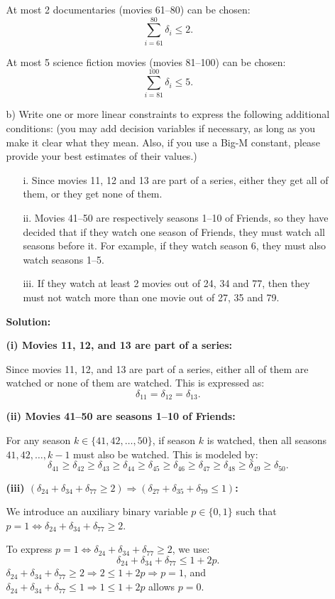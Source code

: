 \documentclass{article}
\begin{document}
\begin{enumerate}
\begin{itemize}
At most 2 documentaries (movies 61--80) can be chosen:
\[
\sum_{i=61}^{80} \delta_i \leq 2.
\]

At most 5 science fiction movies (movies 81--100) can be chosen:
\[
\sum_{i=81}^{100} \delta_i \leq 5.
\]

\item[b)] Write one or more linear constraints to express the following additional conditions: (you may add decision variables if necessary, as long as you make it clear what they mean. Also, if you use a Big-M constant,  please provide your best estimates of their values.)
\begin{itemize}
\item[i.] Since movies 11, 12 and 13 are part of a series, either they get all of them, or they get none of them.
\item[ii.] Movies 41--50 are respectively seasons 1--10 of Friends, so they have decided that if they watch one season of Friends, they must watch all seasons before it. For example, if they watch season 6, they must also watch seasons 1--5.
\item[iii.] If they watch at least 2 movies out of 24, 34 and 77, then they must not watch more than one movie out of 27, 35 and 79.
\end{itemize}

\textbf{Solution:}

\textbf{(i) Movies 11, 12, and 13 are part of a series:}

Since movies 11, 12, and 13 are part of a series, either all of them are watched or none of them are watched. This is expressed as:
\[
\delta_{11} = \delta_{12} = \delta_{13}.
\]

\textbf{(ii) Movies 41--50 are seasons 1--10 of Friends:}

For any season $k \in \{41, 42, \ldots, 50\}$, if season $k$ is watched, then all seasons $41, 42, \ldots, k-1$ must also be watched. This is modeled by:
\[
\delta_{41} \geq \delta_{42} \geq \delta_{43} \geq \delta_{44} \geq \delta_{45} \geq \delta_{46} \geq \delta_{47} \geq \delta_{48} \geq \delta_{49} \geq \delta_{50}.
\]

\textbf{(iii) $(\delta_{24} + \delta_{34} + \delta_{77} \geq 2) \Rightarrow (\delta_{27} + \delta_{35} + \delta_{79} \leq 1)$:}

We introduce an auxiliary binary variable $p \in \{0,1\}$ such that $p = 1 \Leftrightarrow \delta_{24} + \delta_{34} + \delta_{77} \geq 2$.

To express $p = 1 \Leftrightarrow \delta_{24} + \delta_{34} + \delta_{77} \geq 2$, we use:
\[
\delta_{24} + \delta_{34} + \delta_{77} \leq 1 + 2p.
\]
$\delta_{24} + \delta_{34} + \delta_{77} \geq 2 \Rightarrow 2 \leq 1 + 2p \Rightarrow p = 1$, and $\delta_{24} + \delta_{34} + \delta_{77} \leq 1 \Rightarrow 1 \leq 1 + 2p$ allows $p = 0$.


\end{itemize}
\end{enumerate}
\end{document}
